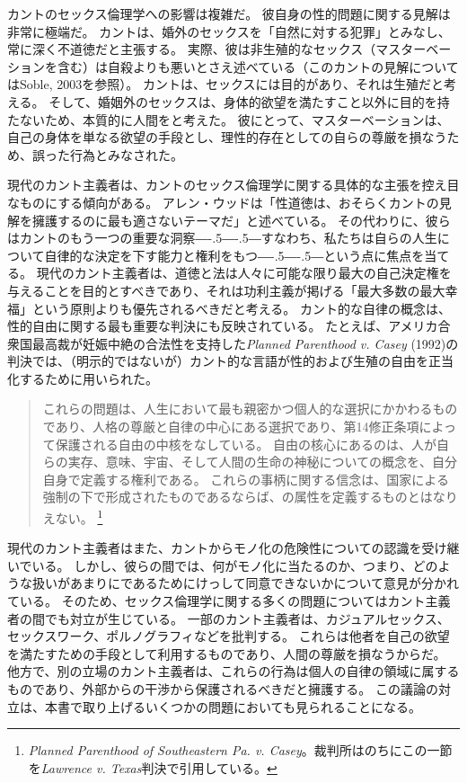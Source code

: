 \documentclass[paper=a4,book,openany]{jlreq}
\def\DDASH{―\kern-.5\zw―\kern-.5\zw―}
\begin{document}
カントのセックス倫理学への影響は複雑だ\citep[]{herman02:_could_it_be_worth_think}。
彼自身の性的問題に関する見解は非常に極端だ。
カントは、婚外のセックスを「自然に対する犯罪」とみなし、常に深く不道徳だと主張する。
実際、彼は非生殖的なセックス（マスターベーションを含む）は自殺よりも悪いとさえ述べている（このカントの見解についてはSoble, 2003\nocite{soble03:_kant_sexual_perver}を参照）。
カントは、セックスには目的があり、それは生殖だと考える。
そして、婚姻外のセックスは、身体的欲望を満たすこと以外に目的を持たないため、本質的に人間をと考えた。
彼にとって、マスターベーションは、自己の身体を単なる欲望の手段とし、理性的存在としての自らの尊厳を損なうため、誤った行為とみなされた。

現代のカント主義者は、カントのセックス倫理学に関する具体的な主張を控え目なものにする傾向がある。
アレン・ウッドは「性道徳は、おそらくカントの見解を擁護するのに最も適さないテーマだ」と述べている\citep[p.224]{wood08:_kantian_ethic}。
その代わりに、彼らはカントのもう一つの重要な洞察{\DDASH}すなわち、私たちは自らの人生について自律的な決定を下す能力と権利をもつ{\DDASH}という点に焦点を当てる。
現代のカント主義者は、道徳と法は人々に可能な限り最大の自己決定権を与えることを目的とすべきであり、それは功利主義が掲げる「最大多数の最大幸福」という原則よりも優先されるべきだと考える。
カント的な自律の概念は、性的自由に関する最も重要な判決にも反映されている。
たとえば、アメリカ合衆国最高裁が妊娠中絶の合法性を支持した\emph{Planned Parenthood v. Casey} (1992)の判決では、（明示的ではないが）カント的な言語が性的および生殖の自由を正当化するために用いられた。

\begin{quote}
これらの問題は、人生において最も親密かつ個人的な選択にかかわるものであり、人格の尊厳と自律の中心にある選択であり、第14修正条項によって保護される自由の中核をなしている。
自由の核心にあるのは、人が自らの実存、意味、宇宙、そして人間の生命の神秘についての概念を、自分自身で定義する権利である。
これらの事柄に関する信念は、国家による強制の下で形成されたものであるならば、の属性を定義するものとはなりえない。
\footnote{\emph{Planned Parenthood of Southeastern Pa. v. Casey}。裁判所はのちにこの一節を\emph{Lawrence v. Texas}判決で引用している。}
\end{quote}

現代のカント主義者はまた、カントからモノ化の危険性についての認識を受け継いでいる。
しかし、彼らの間では、何がモノ化に当たるのか、つまり、どのような扱いがあまりにであるためにけっして同意できないかについて意見が分かれている。
そのため、セックス倫理学に関する多くの問題についてはカント主義者の間でも対立が生じている。
一部のカント主義者は、カジュアルセックス、セックスワーク、ポルノグラフィなどを批判する。
これらは他者を自己の欲望を満たすための手段として利用するものであり、人間の尊厳を損なうからだ。
他方で、別の立場のカント主義者は、これらの行為は個人の自律の領域に属するものであり、外部からの干渉から保護されるべきだと擁護する。
この議論の対立は、本書で取り上げるいくつかの問題においても見られることになる。
\end{document}
